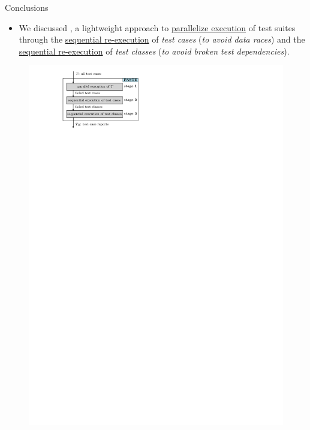 \documentclass{beamer}
\begin{document}
\begin{frame}{Conclusions}
	\begin{itemize}
		\item[]{\footnotesize We discussed {\rsm \textbf{\tname{}}}, a lightweight approach to {\rsm \underline{parallelize execution}} of test suites through the {\rsm \underline{sequential re-execution} of \textit{test cases}} (\textit{to avoid data races}) and the {\rsm \underline{sequential re-execution} of \textit{test classes}} (\textit{to avoid broken test dependencies}).}
	\end{itemize}
	\begin{center}
		\begin{figure}[!htb]
			\centering
			\begin{minipage}{0.475\textwidth}
				\centering
				\includegraphics[width=\linewidth]{images/soundy.pdf}	
			\end{minipage}%

\end{figure}
\end{center}
\end{frame}
\end{document}
